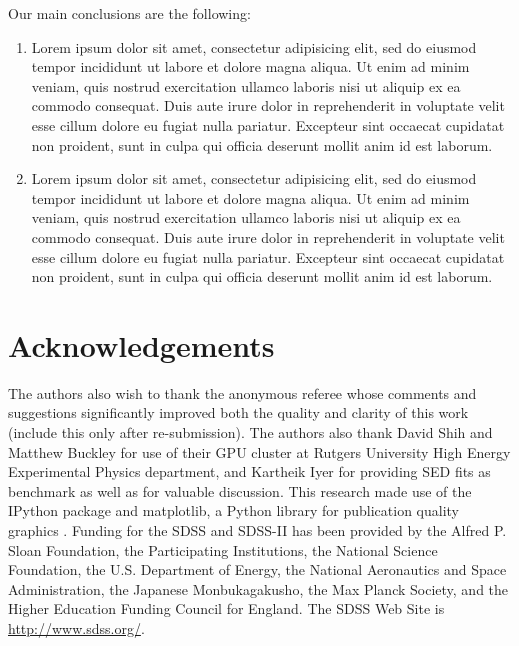 \documentclass[fleqn,usenatbib]{mnras}
\begin{document}
Our main conclusions are the following:
\begin{enumerate}
	\item Lorem ipsum dolor sit amet, consectetur adipisicing elit, sed do eiusmod tempor incididunt ut labore et dolore magna aliqua. Ut enim ad minim veniam, quis nostrud exercitation ullamco laboris nisi ut aliquip ex ea commodo consequat. Duis aute irure dolor in reprehenderit in voluptate velit esse cillum dolore eu fugiat nulla pariatur. Excepteur sint occaecat cupidatat non proident, sunt in culpa qui officia deserunt mollit anim id est laborum.

	\item Lorem ipsum dolor sit amet, consectetur adipisicing elit, sed do eiusmod tempor incididunt ut labore et dolore magna aliqua. Ut enim ad minim veniam, quis nostrud exercitation ullamco laboris nisi ut aliquip ex ea commodo consequat. Duis aute irure dolor in reprehenderit in voluptate velit esse cillum dolore eu fugiat nulla pariatur. Excepteur sint occaecat cupidatat non proident, sunt in culpa qui officia deserunt mollit anim id est laborum.
\end{enumerate}

\section*{Acknowledgements}
 The authors also wish to thank the anonymous referee whose comments and suggestions significantly improved both the quality and clarity of this work (include this only after re-submission).
 The authors also thank David Shih and Matthew Buckley for use of their GPU cluster at Rutgers University High Energy Experimental Physics department, and Kartheik Iyer for providing SED fits as benchmark as well as for valuable discussion.
 This research made use of the {\sc IPython} package \citep{Perez2007} and {\sc matplotlib}, a Python library for publication quality graphics \citep{Hunter2007}. Funding for the SDSS and SDSS-II has been provided by the Alfred P. Sloan Foundation, the Participating Institutions, the National Science Foundation, the U.S. Department of Energy, the National Aeronautics and Space Administration, the Japanese Monbukagakusho, the Max Planck Society, and the Higher Education Funding Council for England. The SDSS Web Site is \url{http://www.sdss.org/}.



%
%

\bsp	%
\label{lastpage}
\end{document}
